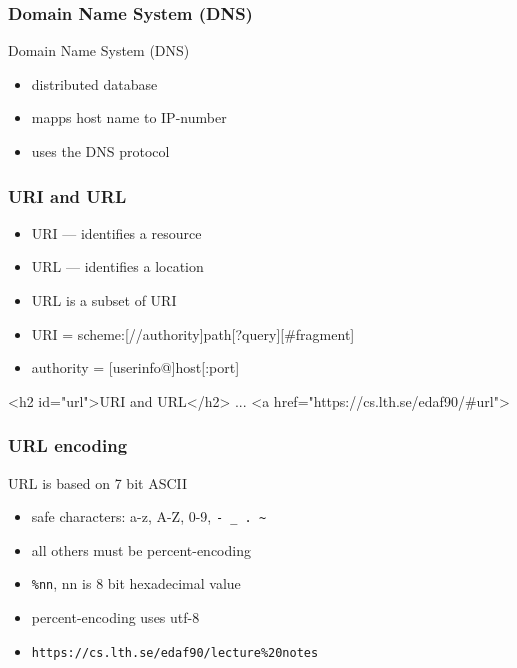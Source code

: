 \begin{frame}[fragile]\frametitle{Domain Name System (DNS)}
Domain Name System (DNS)
\begin{itemize}
  \item distributed database
  \item mapps host name to IP-number
  \item uses the DNS protocol
\end{itemize}
\end{frame}


\begin{frame}[fragile]\frametitle{URI and URL}
\color{structure}
\begin{itemize}\color{structure}
  \item URI --- identifies a resource
  \item URL --- identifies a location
  \item URL is a subset of URI
  \item URI = scheme:[//authority]path[?query][\#fragment]
  \item authority = [userinfo@]host[:port]
\end{itemize}
\vspace{5mm}
\begin{CodeBox}{}
<h2 id="url">URI and URL</h2>
...
<a href="https://cs.lth.se/edaf90/#url">
\end{CodeBox}
\end{frame}

\begin{frame}[fragile]\frametitle{URL encoding}
URL is based on 7 bit ASCII
\begin{itemize}
  \item safe characters: a-z, A-Z, 0-9, \texttt{- \_ . \textasciitilde}
  \item all others must be percent-encoding
  \item \texttt{\%nn}, nn is 8 bit hexadecimal value
  \item percent-encoding uses utf-8
  \item \texttt{https://cs.lth.se/edaf90/lecture\%20notes}
\end{itemize}
\end{frame}


